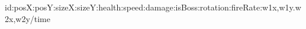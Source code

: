 id\+:pos\+X\+:pos\+Y\+:size\+X\+:size\+Y\+:health\+:speed\+:damage\+:is\+Boss\+:rotation\+:fire\+Rate\+:w1x,w1y.\+w2x,w2y/time 